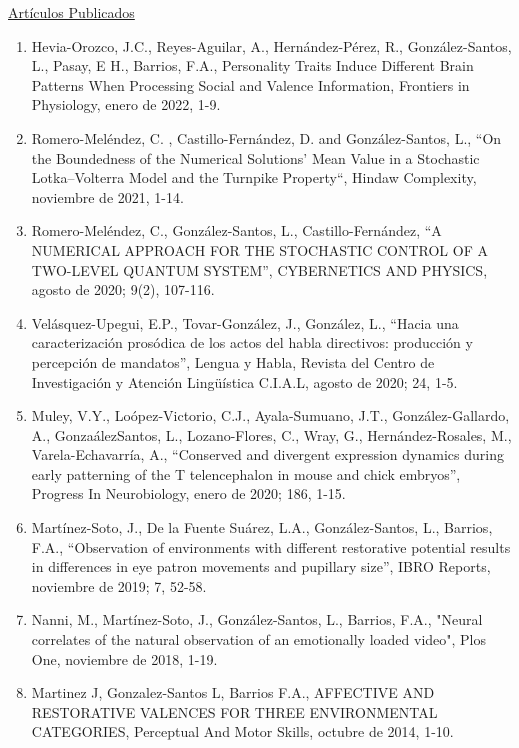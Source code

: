 \underline{\large Artículos Publicados}

\begin{enumerate}[itemsep=-1mm]
\item Hevia-Orozco, J.C., Reyes-Aguilar, A., Hernández-Pérez, R., González-Santos, L., Pasay, E H., Barrios, F.A., Personality Traits Induce Different Brain 
Patterns When Processing Social and Valence Information, Frontiers in Physiology, enero de 2022, 1-9.

\item Romero-Meléndez, C. , Castillo-Fernández, D. and González-Santos, L., “On the Boundedness of the Numerical Solutions’ Mean Value in a Stochastic 
Lotka–Volterra Model and the Turnpike Property“, Hindaw Complexity, noviembre de 2021, 1-14.

\item Romero-Meléndez, C., González-Santos, L., Castillo-Fernández, “A NUMERICAL APPROACH FOR THE STOCHASTIC CONTROL OF A TWO-LEVEL QUANTUM SYSTEM”, 
CYBERNETICS 
AND PHYSICS, agosto de 2020; 9(2), 107-116.

\item Velásquez-Upegui, E.P., Tovar-González, J., González, L., “Hacia una caracterización prosódica de los actos del habla directivos: producción y 
percepción de 
mandatos”, Lengua y Habla, Revista del Centro de Investigación y Atención Lingüística C.I.A.L, agosto de 2020; 24, 1-5.

\item Muley, V.Y., Loópez-Victorio, C.J., Ayala-Sumuano, J.T., González-Gallardo, A., GonzaálezSantos, L., Lozano-Flores, C., Wray, G., Hernández-Rosales, 
M., 
Varela-Echavarría, A., “Conserved and divergent expression dynamics during early patterning of the T telencephalon in mouse and chick embryos”, Progress In 
Neurobiology, enero de 2020; 186, 1-15.

\item Martínez-Soto, J., De la Fuente Suárez, L.A., González-Santos, L., Barrios, F.A., “Observation of environments with different restorative potential 
results 
in differences in eye patron movements and pupillary size”, IBRO Reports, noviembre de 2019; 7, 52-58.

\item Nanni, M., Martínez-Soto, J., González-Santos, L., Barrios, F.A., "Neural correlates of the natural observation of an emotionally loaded video", Plos 
One, 
noviembre de 2018, 1-19.

\item Martinez J, Gonzalez-Santos L, Barrios F.A., AFFECTIVE AND RESTORATIVE VALENCES FOR THREE ENVIRONMENTAL CATEGORIES, Perceptual And Motor Skills, 
octubre de 
2014, 1-10.


\end{enumerate}
